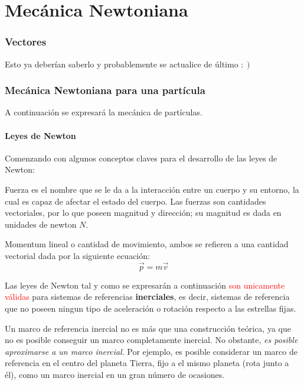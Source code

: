 \documentclass[/home/hernan-barquero/Documents/Apuntes_mecanica_teorica/main.tex]{subfiles}
\begin{document}
	\part{Mecánica Newtoniana} 
	\label{prt:Mecánica Newtoniana}

	\section{Vectores}\label{sec:vectores}


	Esto ya deberían saberlo y probablemente se actualice de último $: \left . \!  \right )$

	\newpage
	\section{Mecánica Newtoniana para una partícula}\label{sec: N.particula }

	A continuación se expresará la mecánica de partículas.

	\subsection{Leyes de Newton}
	
	Comenzando con algunos conceptos claves para el desarrollo de las leyes de Newton:

	\begin{definition}
		Fuerza es el nombre que se le da a la interacción entre un cuerpo y su entorno, la cual es capaz de afectar el estado del cuerpo. Las fuerzas son cantidades vectoriales, por lo que poseen magnitud y dirección; su magnitud es dada en unidades de newton $N$.
	\end{definition}

	\begin{definition}
		Momentum lineal o cantidad de movimiento, ambos se refieren a una cantidad vectorial dada por la siguiente ecuación:
		\begin{equation}
			\vec{p} = m \vec{v}
			\label{eq: momentuml}
		\end{equation}
	\end{definition}
	
	Las leyes de Newton tal y como se expresarán a continuación \textcolor{red}{son unicamente válidas}  para sistemas de referencias \textbf{inerciales}, es decir, sistemas de referencia que no poseen ningun tipo de aceleración o rotación respecto a las estrellas fijas. 
	
	Un marco de referencia inercial no es más que una construcción teórica, ya que no es posible conseguir un marco completamente inercial. No obstante, \textit{es posible aproximarse a un marco inercial}. Por ejemplo, es posible considerar un marco de referencia en el centro del planeta Tierra, fijo a el mismo planeta (rota junto a él), como un marco inercial en un gran número de ocasiones.
\end{document}
